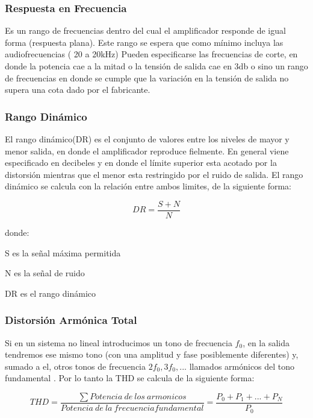 \subsubsection*{Respuesta en Frecuencia}

Es un rango de frecuencias dentro del cual el amplificador responde de igual forma (respuesta plana). Este rango se espera que como mínimo incluya las audiofrecuencias ( 20 a 20kHz)
Pueden especificarse las frecuencias de corte, en donde la potencia cae a la mitad o la tensión de salida cae en 3db o sino un rango de frecuencias en donde se cumple que la variación en la tensión de salida no supera una cota dado por el fabricante.
\medskip 
\subsubsection*{Rango Dinámico}

El rango dinámico(DR) es el conjunto de valores entre los niveles de mayor y menor salida, en donde el amplificador reproduce fielmente. En general viene especificado en decibeles y en donde el límite superior esta acotado por la distorsión mientras que el menor esta restringido por el ruido de salida. El rango dinámico se calcula con la relación entre ambos limites, de la siguiente forma:

\begin{equation}\label{rango_dinamico_eq}
DR= \frac{S+N}{N}
\end{equation}

donde:
\begin{description}
\item S es la señal máxima permitida
\item N es la señal de ruido
\item DR es el rango dinámico
\end{description}
\medskip 
\subsubsection*{Distorsión Armónica Total}

Si en un sistema no lineal introducimos un tono de frecuencia $f_0$, en la salida tendremos ese mismo tono (con una amplitud y fase posiblemente diferentes) y, sumado a el, otros tonos de frecuencia $2f_0, 3f_0, ...$ llamados armónicos del tono fundamental . Por lo tanto la THD se calcula de la siguiente forma:

\begin{equation}\label{THD_eq}
THD= \frac{\sum Potencia~de ~los ~armonicos}{Potencia~ de ~la ~frecuencia fundamental}=\frac{P_0+P_1+...+P_N}{P_0}
\end{equation}

